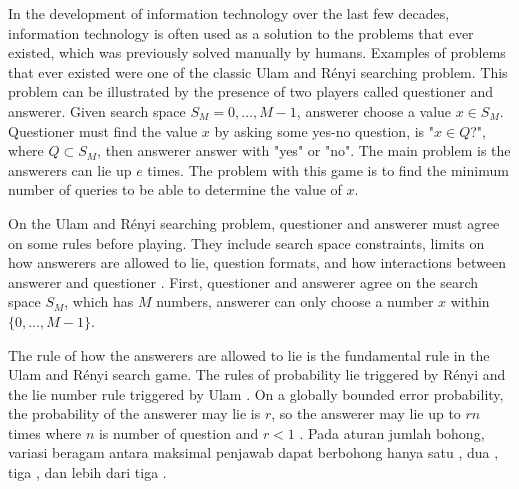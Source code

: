\documentclass[conference,compsoc]{IEEEtran}
\begin{document}
In the development of information technology over the last few decades, information technology is often used as a solution to the problems that ever existed, which was previously solved manually by humans. Examples of problems that ever existed were one of the classic Ulam and Rényi searching problem. This problem can be illustrated by the presence of two players called questioner and answerer. Given search space $S_M = {0,\ldots,M-1}$, answerer choose a value $x \in S_M$. Questioner must find the value $x$ by asking some yes-no question, is "$x \in Q$?", where $Q \subset S_M$, then answerer answer with "yes" or "no". The main problem is the answerers can lie up $e$ times. The problem with this game is to find the minimum number of queries to be able to determine the value of $x$.


On the Ulam and Rényi searching problem, questioner and answerer must agree on some rules before playing. They include search space constraints, limits on how answerers are allowed to lie, question formats, and how interactions between answerer and questioner \cite{Pelc2002}. First, questioner and answerer agree on the search space $S_M$, which has $M$ numbers, answerer can only choose a number $x$ within $\{0,\ldots,M-1\}$.

The rule of how the answerers are allowed to lie is the fundamental rule in the Ulam and Rényi search game. The rules of probability lie triggered by Rényi and the lie number rule triggered by Ulam \cite{Ulam1991}. On a globally bounded error probability, the probability of the answerer may lie is $r$, so the answerer may lie up to $rn$ times where $n$ is number of question and $r<1$ \cite{Dhagat1992}. Pada aturan jumlah bohong, variasi beragam antara maksimal penjawab dapat berbohong hanya satu \cite{Ellis2008} \cite{Pelc1988}, dua \cite{Cicalese2000}, tiga \cite{Negro1992}, dan lebih dari tiga \cite{Berlekamp1998} \cite{Deppe2004}.
\end{document}
